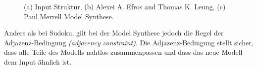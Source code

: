 \documentclass[12pt, a4paper,twoside,openright]{report} %
\begin{document}
\begin{figure}[H]
    \centering
    \qquad
    \qquad
    \caption{(a) Input Struktur, (b) Alexei A. Efros and Thomas K. Leung, (c) Paul Merrell Model Synthese. \cite{merrell2009model}}%
\end{figure}

Anders als bei Sudoku, gilt bei der Model Synthese jedoch die Regel der Adjazenz-Bedingung \textit{(adjacency constraint)}.
Die Adjazenz-Bedingung stellt sicher, dass alle Teile des Modells nahtlos zusammenpassen und dass das neue Modell dem Input ähnlich ist.
\end{document}
